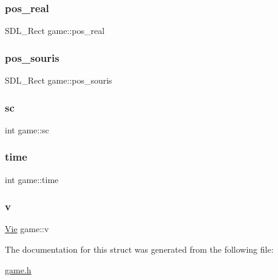 \subsubsection{\texorpdfstring{pos\+\_\+real}{pos\_real}}
{\footnotesize\ttfamily S\+D\+L\+\_\+\+Rect game\+::pos\+\_\+real}

\mbox{\label{structgame_aaf6e725d199a2b7e3b1ebecdf64b4614}} 
\subsubsection{\texorpdfstring{pos\+\_\+souris}{pos\_souris}}
{\footnotesize\ttfamily S\+D\+L\+\_\+\+Rect game\+::pos\+\_\+souris}

\mbox{\label{structgame_ae06e10da51741dbe8cf2977512e81c94}} 
\subsubsection{\texorpdfstring{sc}{sc}}
{\footnotesize\ttfamily int game\+::sc}

\mbox{\label{structgame_a6e10d564623857f7732c73dc10a8ec1d}} 
\subsubsection{\texorpdfstring{time}{time}}
{\footnotesize\ttfamily int game\+::time}

\mbox{\label{structgame_ace63f61e0876a3bcf5285db08b43cb36}} 
\subsubsection{\texorpdfstring{v}{v}}
{\footnotesize\ttfamily \hyperlink{structVie}{Vie} game\+::v}



The documentation for this struct was generated from the following file\+:\begin{DoxyCompactItemize}
\item 
\hyperlink{game_8h}{game.\+h}\end{DoxyCompactItemize}
